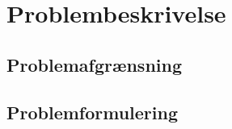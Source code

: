 \chapter{Problembeskrivelse}
\label{sec:problembeskrivelse}
 
\section{Problemafgrænsning}

\section{Problemformulering}

